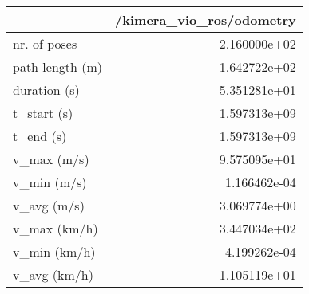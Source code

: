 \begin{tabular}{lr}
\toprule
{} &  /kimera\_vio\_ros/odometry \\
\midrule
nr. of poses    &              2.160000e+02 \\
path length (m) &              1.642722e+02 \\
duration (s)    &              5.351281e+01 \\
t\_start (s)     &              1.597313e+09 \\
t\_end (s)       &              1.597313e+09 \\
v\_max (m/s)     &              9.575095e+01 \\
v\_min (m/s)     &              1.166462e-04 \\
v\_avg (m/s)     &              3.069774e+00 \\
v\_max (km/h)    &              3.447034e+02 \\
v\_min (km/h)    &              4.199262e-04 \\
v\_avg (km/h)    &              1.105119e+01 \\
\bottomrule
\end{tabular}
